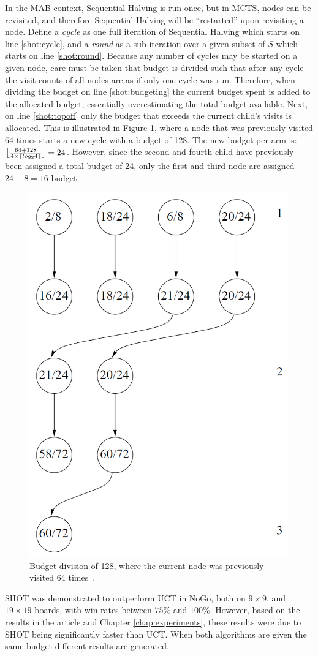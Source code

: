 \documentclass{kecsmstr}
\DeclarePairedDelimiter{\ceil}{\lceil}{\rceil}
\DeclarePairedDelimiter{\floor}{\lfloor}{\rfloor}
\begin{document}
In the MAB context, Sequential Halving is run once, but in MCTS, nodes can be revisited, and therefore Sequential Halving will be ``restarted'' upon revisiting a node. Define a \emph{cycle} as one full iteration of Sequential Halving which starts on line \ref{shot:cycle}, and a \emph{round} as a sub-iteration over a given subset of $S$ which starts on line \ref{shot:round}. Because any number of cycles may be started on a given node, care must be taken that budget is divided such that after any cycle the visit counts of all nodes are as if only one cycle was run. Therefore, when dividing the budget on line \ref{shot:budgeting} the current budget spent is added to the allocated budget, essentially overestimating the total budget available. Next, on line \ref{shot:topoff} only the budget that exceeds the current child's visits is allocated. This is illustrated in Figure \ref{fig:shot-topoffs}, where a node that was previously visited 64 times starts a new cycle with a budget of 128. The new budget per arm is: $\floor[\big]{\frac{64 + 128}{4\times\ceil{log_2{4}}}} = 24$. However, since the second and fourth child have previously been assigned a total budget of 24, only the first and third node are assigned $24-8=16$ budget.

\begin{figure}[h]
	\centering
	\includegraphics[width=.4\textwidth]{img/shot_topoffs.png}
	\caption{Budget division of 128, where the current node was previously visited 64 times~\protect{}.}
	\label{fig:shot-topoffs}
\end{figure}

SHOT was demonstrated to outperform UCT in NoGo, both on $9\times9$, and $19\times19$ boards, with win-rates between $75\%$ and $100\%$. However, based on the results in the article and Chapter \ref{chap:experiments}, these results were due to SHOT being significantly faster than UCT. When both algorithms are given the same budget different results are generated.
\end{document}

